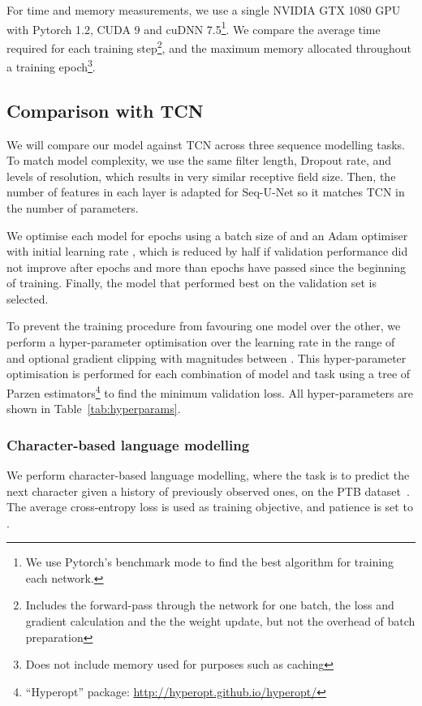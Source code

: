 \documentclass{article}
\begin{document}
For time and memory measurements, we use a single NVIDIA GTX 1080 GPU with Pytorch 1.2, CUDA 9 and cuDNN 7.5\footnote{We use Pytorch's benchmark mode to find the best algorithm for training each network.}.
We compare the average time required for each training step\footnote{Includes the forward-pass through the network for one batch, the loss and gradient calculation and the the weight update, but not the overhead of batch preparation}, and the maximum memory allocated throughout a training epoch\footnote{Does not include memory used for purposes such as caching}.

\subsection{Comparison with TCN}
\label{sec:comparison_tcn}

We will compare our model against TCN across three sequence modelling tasks.
To match model complexity, we use the same filter length, Dropout rate, and levels of resolution, which results in very similar receptive field size.
Then, the number of features in each layer is adapted for Seq-U-Net so it matches TCN in the number of parameters.

We optimise each model for  epochs using a batch size of  and an Adam optimiser with initial learning rate , which is reduced by half if validation performance did not improve after  epochs and more than  epochs have passed since the beginning of training.
Finally, the model that performed best on the validation set is selected.

To prevent the training procedure from favouring one model over the other, we perform a hyper-parameter optimisation over the learning rate  in the range of  and optional gradient clipping with magnitudes between .
This hyper-parameter optimisation is performed for each combination of model and task using a tree of Parzen estimators\footnote{``Hyperopt'' package: \mbox{\url{http://hyperopt.github.io/hyperopt/}}} to find the minimum validation loss.
All hyper-parameters are shown in Table~\ref{tab:hyperparams}.

\subsubsection{Character-based language modelling}
\label{sec:experiments_char}

We perform character-based language modelling, where the task is to predict the next character given a history of previously observed ones, on the PTB dataset~\cite{marcusBuildingLarge1993}.
The average cross-entropy loss is used as training objective, and patience is set to .
\end{document}
